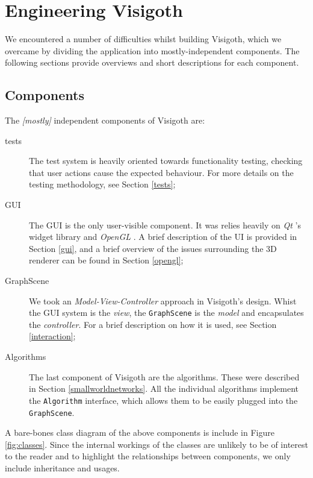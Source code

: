\documentclass[a4paper,11pt,titlepage]{article}
\let\stdsection\section         %
\renewcommand{\section}{\newpage\stdsection}
\newcommand{\code}[1]{\texttt{#1}}
\newcommand{\buzz}[1]{\emph{#1}}
\newcommand{\Qt}{\buzz{Qt} }
\newcommand{\OpenGL}{\buzz{OpenGL} }
\begin{document}
\section{Engineering Visigoth}

We encountered a number of difficulties whilst building Visigoth,
which we overcame by dividing the application into mostly-independent
components. The following sections provide overviews and short
descriptions for each component.

\subsection{Components}
\label{components}

The \emph{[mostly]} independent components of Visigoth are:
\begin{description}
  \item [tests] The test system is heavily oriented towards
    functionality testing, checking that user actions cause the
    expected behaviour. For more details on the testing methodology,
    see Section \ref{tests};

  \item [GUI] The GUI is the only user-visible component. It was
    relies heavily on \Qt's widget library and \OpenGL. A brief
    description of the UI is provided in Section \ref{gui}, and a
    brief overview of the issues surrounding the 3D renderer can be
    found in Section \ref{opengl};

  \item [GraphScene] We took an \buzz{Model-View-Controller} approach
    in Visigoth's design. Whist the GUI system is the \buzz{view}, the
    \code{GraphScene} is the \buzz{model} and encapsulates the
    \buzz{controller}. For a brief description on how it is used, see
    Section \ref{interaction};

  \item [Algorithms] The last component of Visigoth are the
    algorithms. These were described in Section
    \ref{smallworldnetworks}. All the individual algorithms implement
    the \code{Algorithm} interface, which allows them to be easily
    plugged into the \code{GraphScene}.
\end{description}

A bare-bones class diagram of the above components is include in
Figure \ref{fig:classes}. Since the internal workings of the classes
are unlikely to be of interest to the reader and to highlight the
relationships between components, we only include inheritance and
usages.
\end{document}
